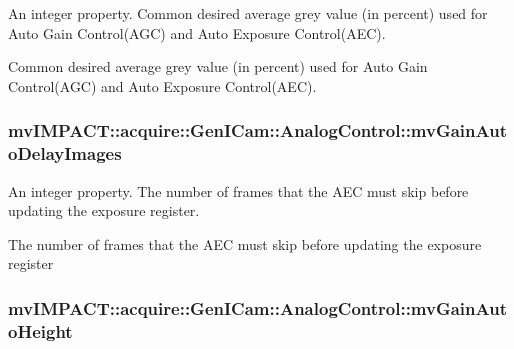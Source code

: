 An integer property. Common desired average grey value (in percent) used for Auto Gain Control(\+A\+G\+C) and Auto Exposure Control(\+A\+E\+C). 

Common desired average grey value (in percent) used for Auto Gain Control(\+A\+G\+C) and Auto Exposure Control(\+A\+E\+C). \hypertarget{classmv_i_m_p_a_c_t_1_1acquire_1_1_gen_i_cam_1_1_analog_control_a9312f2b8c8b6748cafbfc996a560550f}{
\subsubsection[{mv\+Gain\+Auto\+Delay\+Images}]{ mv\+I\+M\+P\+A\+C\+T\+::acquire\+::\+Gen\+I\+Cam\+::\+Analog\+Control\+::mv\+Gain\+Auto\+Delay\+Images}}\label{classmv_i_m_p_a_c_t_1_1acquire_1_1_gen_i_cam_1_1_analog_control_a9312f2b8c8b6748cafbfc996a560550f}


An integer property. The number of frames that the A\+E\+C must skip before updating the exposure register. 

The number of frames that the A\+E\+C must skip before updating the exposure register \hypertarget{classmv_i_m_p_a_c_t_1_1acquire_1_1_gen_i_cam_1_1_analog_control_aac0a850e10f6d415785982d9fc991796}{
\subsubsection[{mv\+Gain\+Auto\+Height}]{ mv\+I\+M\+P\+A\+C\+T\+::acquire\+::\+Gen\+I\+Cam\+::\+Analog\+Control\+::mv\+Gain\+Auto\+Height}}\label{classmv_i_m_p_a_c_t_1_1acquire_1_1_gen_i_cam_1_1_analog_control_aac0a850e10f6d415785982d9fc991796}


